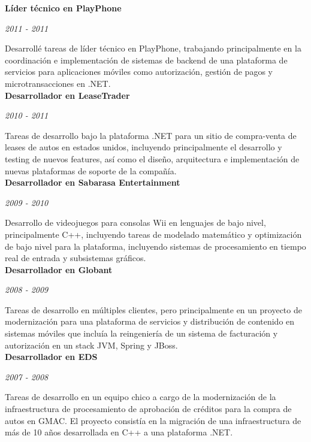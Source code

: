 \documentclass[a4paper,11pt]{article}
\begin{document}
\noindent \textbf{Líder técnico en PlayPhone}

\noindent \emph{2011 - 2011}

\noindent Desarrollé tareas de líder técnico en PlayPhone, trabajando
principalmente en la coordinación e implementación de sistemas de backend de
una plataforma de servicios para aplicaciones móviles como autorización,
gestión de pagos y microtransacciones en .NET. \\

\noindent \textbf{Desarrollador en LeaseTrader}

\noindent \emph{2010 - 2011}

\noindent Tareas de desarrollo bajo la plataforma .NET para un sitio de
compra-venta de leases de autos en estados unidos, incluyendo principalmente el
desarrollo y testing de nuevos features, así como el diseño, arquitectura e
implementación de nuevas plataformas de soporte de la compañía. \\

\noindent \textbf{Desarrollador en Sabarasa Entertainment}

\noindent \emph{2009 - 2010}

\noindent Desarrollo de videojuegos para consolas Wii en lenguajes de bajo
nivel, principalmente C++, incluyendo tareas de modelado matemático y
optimización de bajo nivel para la plataforma, incluyendo sistemas de
procesamiento en tiempo real de entrada y subsistemas gráficos. \\

\noindent \textbf{Desarrollador en Globant}

\noindent \emph{2008 - 2009}

\noindent Tareas de desarrollo en múltiples clientes, pero principalmente en un
proyecto de modernización para una plataforma de servicios y distribución de
contenido en sistemas móviles que incluía la reingeniería de un sistema de
facturación y autorización en un stack JVM, Spring y JBoss. \\

\noindent \textbf{Desarrollador en EDS}

\noindent \emph{2007 - 2008}

\noindent Tareas de desarrollo en un equipo chico a cargo de la modernización
de la infraestructura de procesamiento de aprobación de créditos para la compra
de autos en GMAC. El proyecto consistía en la migración de una infraestructura
de más de 10 años desarrollada en C++ a una plataforma .NET. \\
\end{document}

